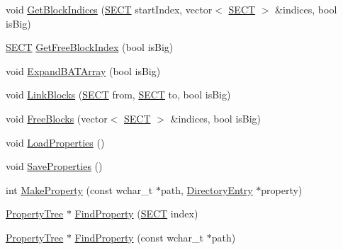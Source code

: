 \begin{DoxyCompactItemize}
\item 
void \hyperlink{class_y_compound_files_1_1_compound_file_aee1b28335f7d3dc945f58c1e3681482c}{Get\+Block\+Indices} (\hyperlink{_basic_excel_8hpp_a784c2e2144ab372c047faeeb0f6a9e6b}{S\+E\+C\+T} start\+Index, vector$<$ \hyperlink{_basic_excel_8hpp_a784c2e2144ab372c047faeeb0f6a9e6b}{S\+E\+C\+T} $>$ \&indices, bool is\+Big)
\item 
\hyperlink{_basic_excel_8hpp_a784c2e2144ab372c047faeeb0f6a9e6b}{S\+E\+C\+T} \hyperlink{class_y_compound_files_1_1_compound_file_ac0ae9f8fb054371f50055a4e47b83680}{Get\+Free\+Block\+Index} (bool is\+Big)
\item 
void \hyperlink{class_y_compound_files_1_1_compound_file_af3077ad279646c68ed346c41b81abbf1}{Expand\+B\+A\+T\+Array} (bool is\+Big)
\item 
void \hyperlink{class_y_compound_files_1_1_compound_file_ab81b7da57d0e41bbe74d5663552d45bb}{Link\+Blocks} (\hyperlink{_basic_excel_8hpp_a784c2e2144ab372c047faeeb0f6a9e6b}{S\+E\+C\+T} from, \hyperlink{_basic_excel_8hpp_a784c2e2144ab372c047faeeb0f6a9e6b}{S\+E\+C\+T} to, bool is\+Big)
\item 
void \hyperlink{class_y_compound_files_1_1_compound_file_acf3e12f09235fdc65b526f177e98d638}{Free\+Blocks} (vector$<$ \hyperlink{_basic_excel_8hpp_a784c2e2144ab372c047faeeb0f6a9e6b}{S\+E\+C\+T} $>$ \&indices, bool is\+Big)
\item 
void \hyperlink{class_y_compound_files_1_1_compound_file_ad179c227a22e45e9d8ede6c00da22887}{Load\+Properties} ()
\item 
void \hyperlink{class_y_compound_files_1_1_compound_file_a7c4e2d7eb98cb517d55aae698e93fc98}{Save\+Properties} ()
\item 
int \hyperlink{class_y_compound_files_1_1_compound_file_a526032a834468f88b4fe279972d84c9c}{Make\+Property} (const wchar\+\_\+t $\ast$path, \hyperlink{class_y_compound_files_1_1_compound_file_1_1_directory_entry}{Directory\+Entry} $\ast$property)
\item 
\hyperlink{class_y_compound_files_1_1_compound_file_1_1_property_tree}{Property\+Tree} $\ast$ \hyperlink{class_y_compound_files_1_1_compound_file_a59e7553ad034ec4fa9169e814aa6dba0}{Find\+Property} (\hyperlink{_basic_excel_8hpp_a784c2e2144ab372c047faeeb0f6a9e6b}{S\+E\+C\+T} index)
\item 
\hyperlink{class_y_compound_files_1_1_compound_file_1_1_property_tree}{Property\+Tree} $\ast$ \hyperlink{class_y_compound_files_1_1_compound_file_aa26cf61ddae6d49245bb945e655cc5a7}{Find\+Property} (const wchar\+\_\+t $\ast$path)

\end{DoxyCompactItemize}
